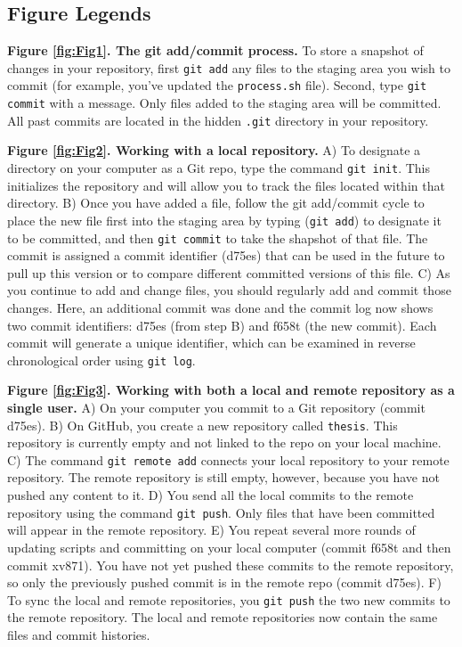 \subsection{Figure Legends}

\textbf{Figure \ref{fig:Fig1}. The git add/commit process.}
To store a snapshot of changes in your repository, first \verb|git add| any files to the staging area you wish to commit (for example, you've updated the \verb|process.sh| file).
Second, type \verb|git commit| with a message. Only files added to the staging area will be committed.
All past commits are located in the hidden \verb|.git| directory in your repository.

\textbf{Figure \ref{fig:Fig2}. Working with a local repository.}
A) To designate a directory on your computer as a Git repo, type the command \verb|git init|. 
This initializes the repository and will allow you to track the files located within that directory.
B) Once you have added a file, follow the git add/commit cycle to place the new file first into the staging area by typing (\verb|git add|) to designate it to be committed, and then \verb|git commit| to take the shapshot of that file. 
The commit is assigned a commit identifier (d75es) that can be used in the future to pull up this version or to compare different committed versions of this file.
C) As you continue to add and change files, you should regularly add and commit those changes. 
Here, an additional commit was done and the commit log now shows two commit identifiers: d75es (from step B) and f658t (the new commit).
Each commit will generate a unique identifier, which can be examined in reverse chronological order using \verb|git log|. 

\textbf{Figure \ref{fig:Fig3}. Working with both a local and remote repository as a single user.}
A) On your computer you commit to a Git repository (commit d75es).
B) On GitHub, you create a new repository called \verb|thesis|.
This repository is currently empty and not linked to the repo on your local machine.
C) The command \verb|git remote add| connects your local repository to your remote repository.
The remote repository is still empty, however, because you have not pushed any content to it.
D) You send all the local commits to the remote repository using the command \verb|git push|.
Only files that have been committed will appear in the remote repository.
E) You repeat several more rounds of updating scripts and committing on your local computer (commit f658t and then commit xv871).
You have not yet pushed these commits to the remote repository, so only the previously pushed commit is in the remote repo (commit d75es).
F) To sync the local and remote repositories, you \verb|git push| the two new commits to the remote repository.
The local and remote repositories now contain the same files and commit histories.

